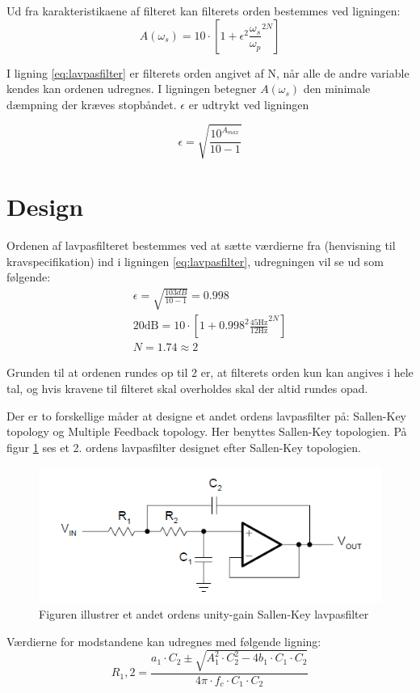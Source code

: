 Ud fra karakteristikaene af filteret kan filterets orden bestemmes ved ligningen: 
\begin{equation} \label{eq:lavpasfilter}
A(\omega_s) = 10 \cdot \left[1 + \epsilon^2 \frac{\omega _s}{\omega _p}^{2N}\right] 
\end{equation}

I ligning \ref{eq:lavpasfilter} er filterets orden angivet af N, når alle de andre variable kendes kan ordenen udregnes. I ligningen betegner $A(\omega _s)$ den minimale dæmpning der kræves stopbåndet. $\epsilon$ er udtrykt ved ligningen
\begin{center}
\begin{equation}
\epsilon = \sqrt{\frac{10^{A_{max}}}{10 - 1}}
\end{equation}
\end{center}

\section{Design}
Ordenen af lavpasfilteret bestemmes ved at sætte værdierne fra (henvisning til kravspecifikation) ind i ligningen \ref{eq:lavpasfilter}, udregningen vil se ud som følgende:
\begin{align}
\epsilon = \sqrt{\frac{103dB}{10 - 1}} = 0.998 \\
20\text{dB} = 10 \cdot \left[1 + 0.998^2 \frac{45\text{Hz}}{12\text{Hz}}^{2N}\right] \\
N = 1.74 \approx 2
\end{align}

Grunden til at ordenen rundes op til 2 er, at filterets orden kun kan angives i hele tal, og hvis kravene til filteret skal overholdes skal der altid rundes opad. 

Der er to forskellige måder at designe et andet ordens lavpasfilter på: Sallen-Key topology og Multiple Feedback topology. Her benyttes Sallen-Key topologien. På figur \ref{fig:SallenKey} ses et 2. ordens lavpasfilter designet efter Sallen-Key topologien.
\begin{figure}[H]
\includegraphics[scale=1]{figures/cProblemloesning/SallenLavpas.PNG}
\caption{Figuren illustrer et andet ordens unity-gain Sallen-Key lavpasfilter}
\label{fig:SallenKey}
\end{figure}
Værdierne for modstandene kan udregnes med følgende ligning:
\begin{equation} \label{eq:LavpasModstande}
R_1,2 = \frac{a_1 \cdot C_2 \pm \sqrt{A_1^2 \cdot C_2^2 - 4b_1 \cdot C_1 \cdot C_2}}{4 \pi \cdot f_c \cdot C_1 \cdot C_2}
\end{equation}

